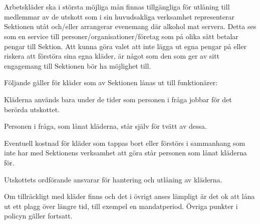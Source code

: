 \documentclass[10pt]{article}
\begin{document}
    \section*{\doctitle}

    Arbetskläder ska i största möjliga mån finnas tillgängliga för utlåning till medlemmar av de utskott som i sin huvudsakliga verksamhet representerar Sektionen utåt och/eller arrangerar evenemang där alkohol mat servera. Detta ses som en service till personer/organisationer/företag som på olika sätt betalar pengar till Sektion. Att kunna göra valet att inte lägga ut egna pengar på eller riskera att förstöra sina egna kläder, är något som den som ger av sitt engagemang till Sektionen bör ha möjlighet till.

    \begin{dashlist}
        \item Följande gäller för kläder som av Sektionen lånas ut till funktionärer:
        \item Kläderna används bara under de tider som personen i fråga jobbar för det berörda utskottet.
        \item Personen i fråga, som lånat kläderna, står själv för tvätt av dessa.
        \item Eventuell kostnad för kläder som tappas bort eller förstörs i sammanhang som inte har med Sektionens verksamhet att göra står personen som lånat kläderna för.
        \item Utskottets ordförande ansvarar för hantering och utlåning av kläderna.
        \item Om tillräckligt med kläder finns och det i övrigt anses lämpligt är det ok att låna ut ett plagg över längre tid, till exempel en mandatperiod. Övriga punkter i policyn gäller fortsatt.
    \end{dashlist}
\end{document}
